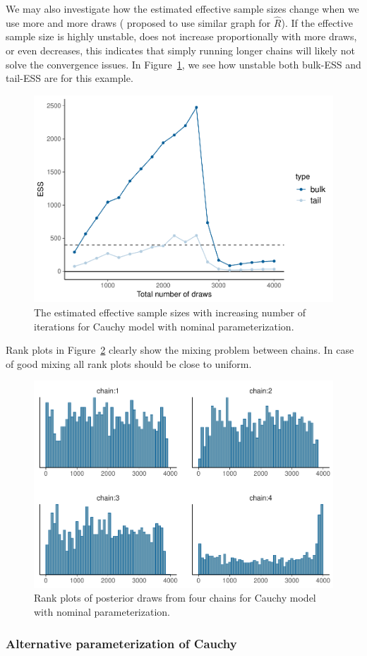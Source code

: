 \documentclass[american,]{article}
\begin{document}
We may also investigate how the estimated effective sample sizes
change when we use more and more draws (\citet{Brooks+Gelman:1998}
proposed to use similar graph for \(\widehat{R}\)). If the effective
sample size is highly unstable, does not increase proportionally with
more draws, or even decreases, this indicates that simply running
longer chains will likely not solve the convergence issues. In
Figure~\ref{fig:change-ess-fit-nom-1}, we see how unstable both
bulk-ESS and tail-ESS are for this example.
\begin{figure}[tp]
  \centering
  \includegraphics[width=0.6\linewidth]{graphics/change-ess-fit-nom-1.pdf}
  \caption{The estimated effective sample sizes with increasing number of iterations for Cauchy model with nominal parameterization.}
  \label{fig:change-ess-fit-nom-1}
\end{figure}
Rank plots in Figure~\ref{fig:hist-fit-nom-1} clearly show the
mixing problem between chains. In case of good mixing all rank plots
should be close to uniform.
\begin{figure}[tp]
  \centering
  \includegraphics[width=0.6\linewidth]{graphics/hist-fit-nom-1.pdf}
  \caption{Rank plots of posterior draws from four chains for Cauchy model with nominal parameterization.}
  \label{fig:hist-fit-nom-1}
\end{figure}

\hypertarget{alternative-parameterization-of-cauchy}{%
\subsubsection{Alternative parameterization of
Cauchy}\label{alternative-parameterization-of-cauchy}}
\end{document}
